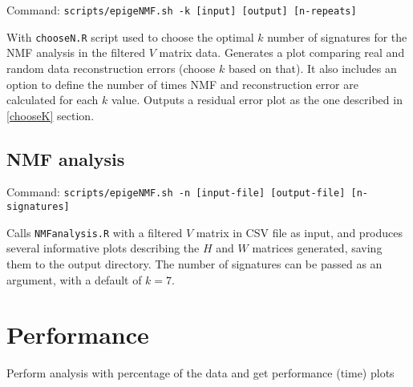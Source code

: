 Command: \texttt{scripts/epigeNMF.sh -k [input] [output] [n-repeats]}

\smallskip

With \texttt{chooseN.R} script used to choose the optimal \(k\) number of signatures for the NMF analysis in the filtered \(V\) matrix data. Generates a plot comparing real and random data reconstruction errors (choose \(k\) based on that). It also includes an option to define the number of times NMF and reconstruction error are calculated for each \(k\) value. Outputs a residual error plot as the one described in \ref{chooseK} section.

\subsection{NMF analysis}

Command: \texttt{scripts/epigeNMF.sh -n [input-file] [output-file] [n-signatures]}

\smallskip

Calls \texttt{NMFanalysis.R} with a filtered \(V\) matrix in CSV file as input, and produces several informative plots describing the \(H\) and \(W\) matrices generated, saving them to the output directory. The number of signatures can be passed as an argument, with a default of \(k = 7\). 


\section{Performance}

Perform analysis with percentage of the data and get performance (time) plots
